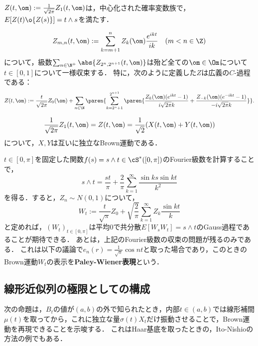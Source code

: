 \documentclass[uplatex,dvipdfmx]{jsreport}
\begin{document}
\begin{proposition}[$Z_1$はBrown運動の複素形とみなせる]
    $Z(t,\om):=\frac{1}{\sqrt{2\pi}}Z_1(t,\om)$は，中心化された確率変数族で，$E[Z(t)\o{Z(s)}]=t\land s$を満たす．
\end{proposition}

\begin{proposition}[収束問題の解決]
    \[Z_{m,n}(t,\om):=\sum_{k=m+1}^nZ_k(\om)\frac{e^{ikt}}{ik}\quad(m<n\in\Z)\]
    について，級数$\sum_{n\in\N^+}\abs{Z_{2^n,2^{n+1}}(t,\om)}$は殆ど全ての$\om\in\Om$について$t\in[0,1]$について一様収束する．
    特に，次のように定義した$Z$は広義の$C$-過程である：
    \[Z(t,\om):=\frac{t}{\sqrt{2\pi}}Z_0(\om)+\sum_{n\in\N}\paren{\sum_{k=2^n+1}^{2^{n+1}}\paren{\frac{Z_k(\om)(e^{ikt}-1)}{i\sqrt{2\pi}k}+\frac{Z_{-k}(\om)(e^{-ikt}-1)}{-i\sqrt{2\pi}k}}}.\]
\end{proposition}

\begin{proposition}
    \[\frac{1}{\sqrt{2\pi}}Z_1(t,\om)=Z(t,\om)=\frac{1}{\sqrt{2}}(X(t,\om)+Y(t,\om))\]
    について，$X,Y$は互いに独立なBrown運動である．
\end{proposition}

\begin{remarks}
    $t\in[0,\pi]$を固定した関数$f(s)=s\land t\in\cS^*([0,\pi])$のFourier級数を計算することで，
    \[s\land t=\frac{st}{\pi}+\frac{2}{\pi}\sum^\infty_{k=1}\frac{\sin ks\sin kt}{k^2}\]
    を得る．すると，$Z_n\sim N(0,1)$について，
    \[W_t:=\frac{t}{\sqrt{\pi}}Z_0+\sqrt{\frac{2}{\pi}}\sum^\infty_{k=1}Z_k\frac{\sin kt}{k}\]
    と定めれば，$(W_t)_{t\in[0,\pi]}$は平均$0$で共分散$E[W_sW_t]=s\land t$のGauss過程であることが期待できる．
    あとは，上記のFourier級数の収束の問題が残るのみである．
    これは以下の議論で$e_n(r)=\frac{1}{\sqrt{\pi}}\cos nt$と取った場合であり，このときのBrown運動$W_t$の表示を\textbf{Paley-Wiener表現}という．
\end{remarks}



\subsection{線形近似列の極限としての構成}

\begin{tcolorbox}[colframe=ForestGreen, colback=ForestGreen!10!white,breakable,colbacktitle=ForestGreen!40!white,coltitle=black,fonttitle=\bfseries\sffamily,
title=]
    次の命題は，$B_t$の値が$(a,b)$の外で知られたとき，内部$t\in(a,b)$では線形補間$\mu(t)$を取ってから，これに独立な量$\sigma(t)X_t$だけ振動させることで，Brown運動を再現できることを示唆する．
    これはHaar基底を取ったときの，Ito-Nishioの方法の例でもある．
\end{tcolorbox}
\end{document}
